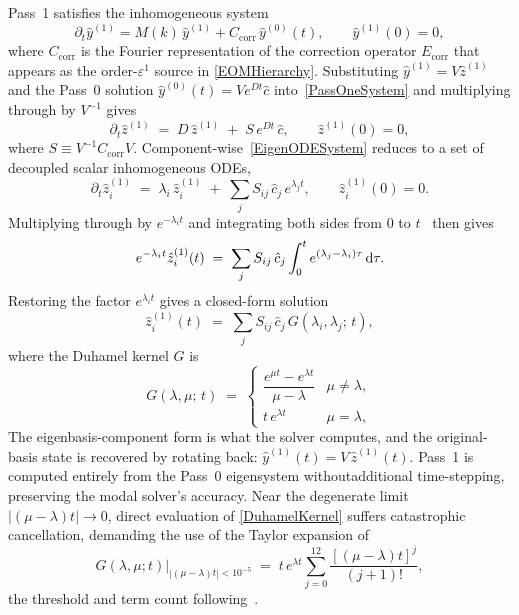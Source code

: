Pass~1 satisfies the inhomogeneous system
\begin{equation}
  \partial_t\hat{y}^{(1)} = M(k)\,\hat{y}^{(1)} + C_{\mathrm{corr}}\,\hat{y}^{(0)}(t),
  \qquad \hat{y}^{(1)}(0) = 0,
  \label{PassOneSystem}
\end{equation}
where $C_{\mathrm{corr}}$ is the Fourier representation of the correction operator
$E_{\mathrm{corr}}$ that appears as the order-$\varepsilon^1$ source in
\cref{EOMHierarchy}.
Substituting $\hat{y}^{(1)} = V\hat{z}^{(1)}$ and the Pass~0 solution
$\hat{y}^{(0)}(t) = V e^{Dt}\hat{c}$ into~\cref{PassOneSystem} and multiplying
through by $V^{-1}$ gives
\begin{equation}
  \partial_t\hat{z}^{(1)}
  \;=\;
  D\,\hat{z}^{(1)}
  \;+\; S\,e^{Dt}\,\hat{c},
  \qquad \hat{z}^{(1)}(0) = 0,
  \label{EigenODESystem}
\end{equation}
where $S \equiv V^{-1}C_{\mathrm{corr}}V$.
Component-wise~\cref{EigenODESystem} reduces to a set of decoupled scalar
inhomogeneous ODEs,
\begin{equation}
  \partial_t\hat{z}^{(1)}_i
  \;=\;
  \lambda_i\,\hat{z}^{(1)}_i
  \;+\; \sum_j S_{ij}\,\hat{c}_j\,e^{\lambda_j t},
  \qquad \hat{z}^{(1)}_i(0) = 0.
  \label{EigenODE}
\end{equation}
Multiplying through by $e^{-\lambda_i t}$ and integrating both sides from $0$ to
$t$~\cite{hochbruck2010exponential,almohy2011action} then gives
\begin{equation}
  e^{-\lambda_i t}\hat{z}^{(1)}_i(t)
  \;=\;
  \sum_j S_{ij}\,\hat{c}_j
  \int_0^t e^{(\lambda_j - \lambda_i)\tau}\,\mathrm{d}\tau.
  \label{DuhamelIntegral}
\end{equation}
Restoring the factor $e^{\lambda_i t}$ gives a closed-form solution
\begin{equation}
  \hat{z}^{(1)}_i(t)
  \;=\;
  \sum_j S_{ij}\,\hat{c}_j\,G(\lambda_i,\lambda_j;\,t),
  \label{DuhamelSolution}
\end{equation}
where the Duhamel kernel $G$ is~\cite{hochbruck2010exponential,almohy2011action}
\begin{equation}
  G(\lambda,\mu;\,t)
  \;=\;
  \begin{cases}
    \dfrac{e^{\mu t} - e^{\lambda t}}{\mu - \lambda} & \mu \neq \lambda, \\[6pt]
    t\,e^{\lambda t} & \mu = \lambda,
  \end{cases}
  \label{DuhamelKernel}
\end{equation}
The eigenbasis-component form is what the solver computes, and the original-basis
state is recovered by rotating back:
$\hat{y}^{(1)}(t) = V\,\hat{z}^{(1)}(t)$. Pass~1 is computed entirely from
the Pass~0 eigensystem withoutadditional time-stepping, preserving the modal solver's accuracy.
Near the degenerate limit $|(\mu-\lambda)t| \to 0$, direct evaluation of
\cref{DuhamelKernel} suffers catastrophic cancellation, demanding the use of the Taylor expansion of
\begin{equation}
  G(\lambda,\mu;t)\bigl|_{|(\mu-\lambda)t|<10^{-5}}
  \;=\;
  t\,e^{\lambda t}\sum_{j=0}^{12}\frac{[(\mu-\lambda)t]^{j}}{(j+1)!},
  \label{DuhamelTaylor}
\end{equation}
the threshold and term count following~\cite{almohy2011action}.

